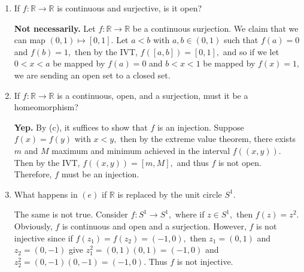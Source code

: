 \documentclass[11pt]{article}
\newcommand{\bbR}{\mathbb{R}}
\begin{document}
\begin{enumerate}
\begin{solution}
    \end{solution}
    \item 
    \begin{problem}
        If $f: \bbR \to \bbR$ is continuous and surjective, is it open?
    \end{problem}
    \begin{solution}
        \textbf{Not necessarily.} Let $f:\bbR \to \bbR$ be a continuous surjection. We claim that we can map $(0,1) \mapsto [0,1]$. Let $a<b$ with $a,b\in (0,1)$ such that $f(a) = 0$ and $f(b) = 1,$ then by the IVT, $f([a,b]) = [0,1],$ and so if we let $0<x<a$ be mapped by $f(a) = 0$ and $b<x<1$ be mapped by $f(x) = 1,$ we are sending an open set to a closed set.
    \end{solution}
    \item 
    \begin{problem}
        If $f: \bbR \to \bbR$ is a continuous, open, and a surjection, must it be a homeomorphism?
    \end{problem}
    \begin{solution}
        \textbf{Yep.} By (c), it suffices to show that $f$ is an injection. Suppose $f(x) = f(y)$ with $x<y,$ then by the extreme value theorem, there exists $m$ and $M$ maximum and minimum achieved in the interval $f((x,y)).$ Then by the IVT, $f((x,y)) = [m,M],$ and thus $f$ is not open. Therefore, $f$ must be an injection.
    \end{solution}
    \item 
    \begin{problem}
        What happens in $(e)$ if $\bbR$ is replaced by the unit circle $S^1.$ 
    \end{problem}
    \begin{solution}
    The same is not true. Consider $f: S^1 \to S^1,$ where if $z\in S^1,$ then $f(z) = z^2.$ Obviously, $f$ is continuous and open and a surjection. However, $f$ is not injective since if $f(z_1) = f(z_2) = (-1,0),$ then $z_1 = (0,1)$ and $z_2 = (0,-1)$ give $z_1^2 = (0,1)(0,1) = (-1, 0)$ and $z_2^2 = (0,-1)(0,-1) = (-1,0).$ Thus $f$ is not injective.    
    \end{solution}
    \end{enumerate}

\newpage
\end{document}

